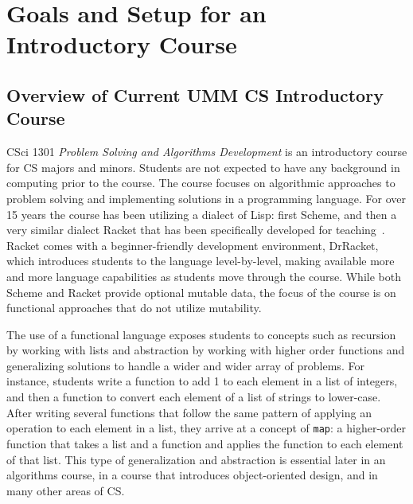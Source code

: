 \documentclass[12pt]{article}
\newcommand{\comment}[1]{}
\newcommand{\emcomment}[1]{\textcolor{ForestGreen}{\comment{Elena: {#1}}}}
\newcommand{\pscomment}[1]{\textcolor{red}{\comment{Paul: {#1}}}}
\begin{document}
\section{Goals and Setup for an Introductory Course}\label{sec:racket-clojure}


\subsection{Overview of Current UMM CS Introductory Course}\label{subsec:course}
CSci 1301 {\it Problem Solving and Algorithms Development} is an introductory course for CS majors and minors. Students are not expected to have any background in computing prior to the course. The course focuses on algorithmic approaches to problem solving and implementing solutions in a programming language. For over 15 years the course has been utilizing a dialect of Lisp: first Scheme, and then a very similar dialect Racket that has been specifically developed for teaching~\cite{htdp}. Racket comes with a beginner-friendly development environment, DrRacket, which introduces students to the language level-by-level, making available more and more language capabilities as students move through the course. While both Scheme and Racket provide optional mutable data, the focus of the course is on functional approaches that do not utilize mutability. 

The use of a functional language exposes students to concepts such as recursion by working with lists and abstraction by working with higher order functions and generalizing solutions to handle a wider and wider array of problems. For instance, students write a function to add 1 to each element in a list of integers, and then a function to convert each element of a list of strings to lower-case. After writing several functions that follow the same pattern of applying an operation to each element in a list, they arrive at a concept of {\tt map}: a higher-order function that takes a list and a function and applies the function to each element of that list. This type of generalization and abstraction is essential later in an algorithms course, in a course that introduces object-oriented design, and in many other areas of CS. 
\end{document}
